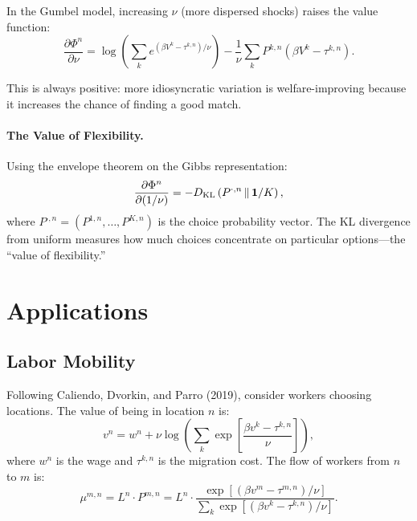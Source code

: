 In the Gumbel model, increasing $\nu$ (more dispersed shocks) raises the value function:
\begin{equation}
\frac{\partial \Phi^n}{\partial \nu} = \log \left( \sum_k e^{(\beta V^k - \tau^{k,n})/\nu} \right) - \frac{1}{\nu} \sum_k P^{k,n} (\beta V^k - \tau^{k,n}).
\end{equation}

This is always positive: more idiosyncratic variation is welfare-improving because it increases the chance of finding a good match.

\paragraph{The Value of Flexibility.}

Using the envelope theorem on the Gibbs representation:
\begin{equation}
\frac{\partial \Phi^n}{\partial (1/\nu)} = -D_{\mathrm{KL}}\left(P^{\cdot,n} \,\|\, \mathbf{1}/K\right),
\end{equation}
where $P^{\cdot,n} = (P^{1,n}, \ldots, P^{K,n})$ is the choice probability vector. The KL divergence from uniform measures how much choices concentrate on particular options---the ``value of flexibility.''

\section{Applications}
\label{sec:discrete-applications}

\subsection{Labor Mobility}

Following Caliendo, Dvorkin, and Parro (2019), consider workers choosing locations. The value of being in location $n$ is:
\begin{equation}
v^n = w^n + \nu \log \left( \sum_k \exp\left[ \frac{\beta v^k - \tau^{k,n}}{\nu} \right] \right),
\end{equation}
where $w^n$ is the wage and $\tau^{k,n}$ is the migration cost. The flow of workers from $n$ to $m$ is:
\begin{equation}
\mu^{m,n} = L^n \cdot P^{m,n} = L^n \cdot \frac{\exp[(\beta v^m - \tau^{m,n})/\nu]}{\sum_k \exp[(\beta v^k - \tau^{k,n})/\nu]}.
\end{equation}

